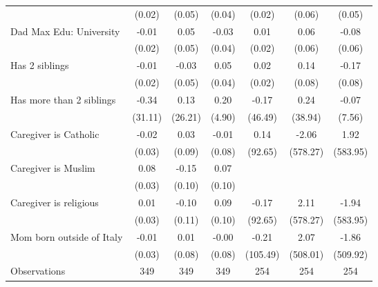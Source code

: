 {\begin{tabular}{l*{6}{c}}
                    &      (0.02)         &      (0.05)         &      (0.04)         &      (0.02)         &      (0.06)         &      (0.05)         \\
\addlinespace
Dad Max Edu: University&       -0.01         &        0.05         &       -0.03         &        0.01         &        0.06         &       -0.08         \\
                    &      (0.02)         &      (0.05)         &      (0.04)         &      (0.02)         &      (0.06)         &      (0.06)         \\
\addlinespace
Has 2 siblings      &       -0.01         &       -0.03         &        0.05         &        0.02         &        0.14         &       -0.17\sym{*}  \\
                    &      (0.02)         &      (0.05)         &      (0.04)         &      (0.02)         &      (0.08)         &      (0.08)         \\
\addlinespace
Has more than 2 siblings&       -0.34         &        0.13         &        0.20         &       -0.17         &        0.24         &       -0.07         \\
                    &     (31.11)         &     (26.21)         &      (4.90)         &     (46.49)         &     (38.94)         &      (7.56)         \\
\addlinespace
Caregiver is Catholic&       -0.02         &        0.03         &       -0.01         &        0.14         &       -2.06         &        1.92         \\
                    &      (0.03)         &      (0.09)         &      (0.08)         &     (92.65)         &    (578.27)         &    (583.95)         \\
\addlinespace
Caregiver is Muslim &        0.08\sym{**} &       -0.15         &        0.07         &                 &                 &                 \\
                    &      (0.03)         &      (0.10)         &      (0.10)         &                  &                  &                  \\
\addlinespace
Caregiver is religious&        0.01         &       -0.10         &        0.09         &       -0.17         &        2.11         &       -1.94         \\
                    &      (0.03)         &      (0.11)         &      (0.10)         &     (92.65)         &    (578.27)         &    (583.95)         \\
\addlinespace
Mom born outside of Italy&       -0.01         &        0.01         &       -0.00         &       -0.21         &        2.07         &       -1.86         \\
                    &      (0.03)         &      (0.08)         &      (0.08)         &    (105.49)         &    (508.01)         &    (509.92)         \\
\midrule
Observations        &         349         &         349         &         349         &         254         &         254         &         254         \\
\bottomrule
\end{tabular}
}
